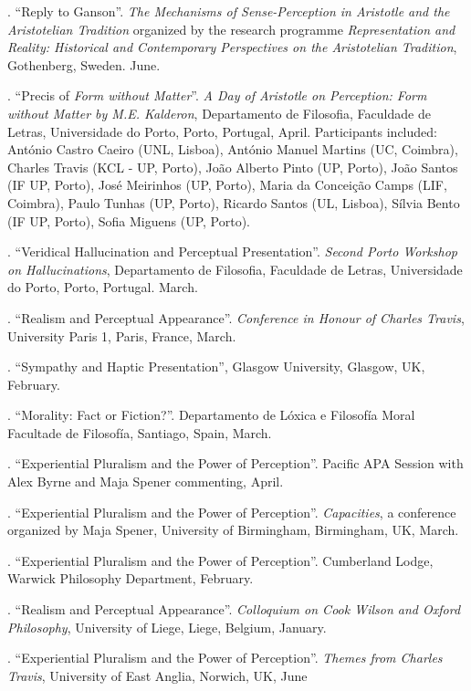 \documentclass[11pt]{article}
\begin{document}
. ``Reply to Ganson''. \emph{The Mechanisms of Sense-Perception in Aristotle and the Aristotelian Tradition} organized by the research programme
\emph{Representation and Reality: Historical and Contemporary Perspectives on the Aristotelian Tradition}, Gothenberg, Sweden. June.

. ``Precis of \emph{Form without Matter}''. \emph{A Day of Aristotle on Perception: Form without Matter by M.E. Kalderon}, Departamento de Filosofia, Faculdade de Letras, Universidade do Porto, Porto, Portugal, April. Participants included: António Castro Caeiro (UNL, Lisboa), António Manuel Martins (UC, Coimbra), Charles Travis (KCL - UP, Porto), João Alberto Pinto (UP, Porto), João Santos (IF UP, Porto), José Meirinhos (UP, Porto), Maria da Conceição Camps (LIF, Coimbra), Paulo Tunhas (UP, Porto), Ricardo Santos (UL, Lisboa), Sílvia Bento (IF UP, Porto), Sofia Miguens (UP, Porto).

. ``Veridical Hallucination and Perceptual Presentation''. \emph{Second Porto Workshop on Hallucinations}, Departamento de Filosofia, Faculdade de Letras, Universidade do Porto, Porto, Portugal. March.

. ``Realism and Perceptual Appearance''. \emph{Conference in Honour of Charles Travis}, University Paris 1, Paris, France, March.

. ``Sympathy and Haptic Presentation'', Glasgow University, Glasgow, UK, February.

. ``Morality: Fact or Fiction?''. Departamento de Lóxica e Filosofía Moral
Facultade de Filosofía, Santiago, Spain, March.

. ``Experiential Pluralism and the Power of Perception''. Pacific APA Session with Alex Byrne and Maja Spener commenting, April.

. ``Experiential Pluralism and the Power of Perception''. \emph{Capacities}, a conference organized by Maja Spener, University of Birmingham, Birmingham, UK, March.

. ``Experiential Pluralism and the Power of Perception''. Cumberland Lodge, Warwick Philosophy Department, February.

. ``Realism and Perceptual Appearance''. \emph{Colloquium on Cook Wilson and Oxford Philosophy}, University of Liege, Liege, Belgium, January.

. ``Experiential Pluralism and the Power of Perception''. \emph{Themes from Charles Travis}, University of East Anglia, Norwich, UK, June
\end{document}
